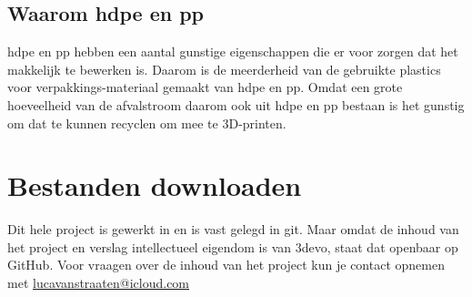 \subsection{Waarom \ac{hdpe} en \ac{pp}}

\ac{hdpe} en \ac{pp} hebben een aantal gunstige eigenschappen die er voor
zorgen dat het makkelijk te bewerken is.  Daarom is de meerderheid van de
gebruikte plastics voor verpakkings-materiaal gemaakt van \ac{hdpe} en \ac{pp}.
Omdat een grote hoeveelheid van de afvalstroom daarom ook uit \ac{hdpe} en
\ac{pp} bestaan is het gunstig om dat te kunnen recyclen om mee te 3D-printen.

\section{Bestanden downloaden}

Dit hele project is gewerkt in en is vast gelegd in git. Maar omdat de inhoud
van het project en verslag intellectueel eigendom is van 3devo, staat dat
openbaar op GitHub. Voor vraagen over de inhoud van het project kun je contact
opnemen met
\href{mailto:lucavanstraaten@icloud.com}{lucavanstraaten@icloud.com}

